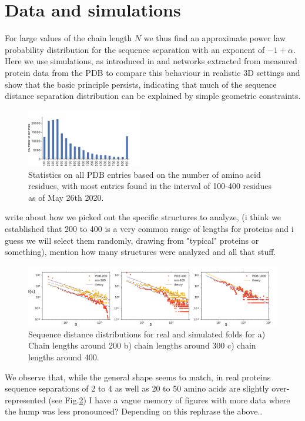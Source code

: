 \documentclass[
reprint,
twocolumn,
amsmath,amssymb,superscriptaddress,aps,
pre]{revtex4-1}
\newcommand{\red}[1]{\textcolor{red!80!black}{#1}}
\begin{document}
\section*{Data and simulations}
 For large values of the chain length $N$ we thus find an approximate power law probability distribution for the sequence separation with an exponent of $-1+\alpha$. Here we use simulations, as introduced in \cite{molkenthin2020self} and networks extracted from measured protein data from the PDB \cite{PDB} to compare this behaviour in realistic 3D settings and show that the basic principle persists, indicating that much of the sequence distance separation distribution can be explained by simple geometric constraints.
 \begin{figure}[h]
        \centering
	\includegraphics[width=0.45\textwidth]{figures/pdb_statistics.pdf}
        \caption{Statistics on all PDB entries based on the number of amino acid residues, with most entries found in the interval of 100-400 residues as of May 26th 2020.}
        \label{fig:pdb_stats}
\end{figure}

 \red{write about how we picked out the specific structures to analyze, (i think we established that 200 to 400 is a very common range of lengths for proteins and i guess we will select them randomly, drawing from "typical" proteins or something), mention how many structures were analyzed and all that stuff.}
 
\begin{figure}[t]
        \centering
	\includegraphics[width=\textwidth]{paper/figures/resultsfig_old.pdf}
        \caption{Sequence distance distributions for real and simulated folds for a) Chain lengths around 200 b) chain lengths around 300 c) chain lengths around 400.
        }
        \label{fig:sdd}
\end{figure}
We observe that, while the general shape seems to match, in real proteins sequence separations of 2 to 4 as well as 20 to 50 amino acids are slightly over-represented (see Fig.\ref{fig:sdd}) \red{I have a vague memory of figures with more data where the hump was less pronounced? Depending on this rephrase the above.}.
\end{document}
